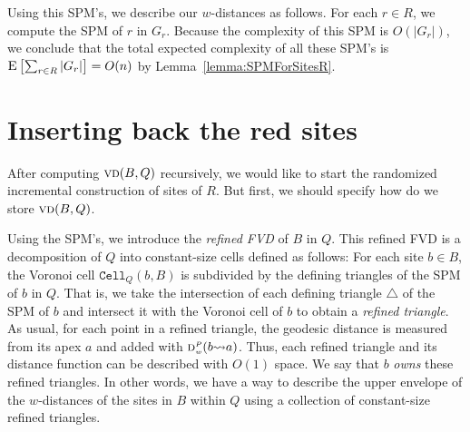 \documentclass[a4paper, 11pt]{article}
\newcommand{\s}{\mathcal S}
\newcommand{\dd}[3][P]{\ensuremath{\textsc{d}_{\scriptscriptstyle w}^{\scriptscriptstyle #1}(#2 {\leadsto} #3)}}
\newcommand{\p}[3][P]{\ensuremath{\pi_{_{#1}}(#2, #3)}}
\newcommand{\cell}[2][P]{\ensuremath{\mathtt{Cell}_{\scriptscriptstyle #1}(#2)}}
\newcommand{\vd}[2][P]{\textsc{vd}(#2, #1)}
\newcommand{\ex}[1]{\textsc{E}\left[#1\right]}
\begin{document}
Using this SPM's, we describe our $w$-distances as follows.
For each $r\in R$, we compute the SPM of $r$ in $G_r$.
Because the complexity of this SPM is $O(|G_r|)$, we conclude that the total expected complexity of all these SPM's is $\ex{\sum_{r\in R} |G_r|} = O(n)$ by Lemma~\ref{lemma:SPMForSitesR}.


\section{Inserting back the red sites}\label{section: Insertion process}

After computing $\vd[Q]{B}$ recursively, we would like to start the randomized incremental construction of sites of $R$. 
But first, we should specify how do we store $\vd[Q]{B}$. 


Using the SPM's, we introduce the \emph{refined FVD} of $B$ in $Q$.
This refined FVD is a decomposition of $Q$ into constant-size cells defined as follows:
For each site $b\in B$, the Voronoi cell $\cell[Q]{b, B}$ is subdivided by the defining triangles of the SPM of $b$ in $Q$. 
That is, we take the intersection of each defining triangle $\triangle$ of the SPM of $b$ and intersect it with the Voronoi cell of $b$ to obtain a \emph{refined triangle}. 
As usual, for each point in a refined triangle, the geodesic distance is measured from its apex $a$ and added with $\dd{b}{a}$. 
Thus, each refined triangle and its distance function can be described with $O(1)$ space. We say that $b$ \emph{owns} these refined triangles. 
In other words, we have a way to describe the upper envelope of the $w$-distances of the sites in $B$ within $Q$ using a collection of constant-size refined triangles. 
\end{document}
